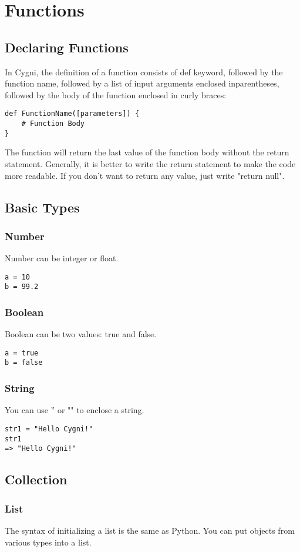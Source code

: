 \chapter{Functions}
\section{Declaring Functions}
In Cygni, the definition of a function consists of def keyword, followed by the function name, followed by a list of input arguments enclosed inparentheses, followed by the body of the function enclosed in curly braces:
\begin{lstlisting}
def FunctionName([parameters]) {
	# Function Body
}
\end{lstlisting}
The function will return the last value of the function body without the return statement. Generally, it is better to write the return statement to make the code more readable. If you don't want to return any value, just write "return null".
\section{Basic Types}
\subsection{Number}
	Number can be integer or float.
\begin{lstlisting}
a = 10
b = 99.2
\end{lstlisting}

\subsection{Boolean}
	Boolean can be two values: true and false.
\begin{lstlisting}
a = true
b = false
\end{lstlisting}

\subsection{String}
	You can use '' or "" to enclose a string.
\begin{lstlisting}
str1 = "Hello Cygni!"
str1
=> "Hello Cygni!"
\end{lstlisting}

\section{Collection}
\subsection{List}
The syntax of initializing a list is the same as Python. You can put objects from various types into a list.

